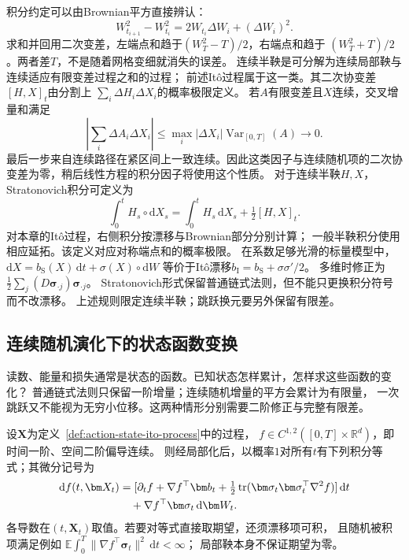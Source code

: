 积分约定可以由Brownian平方直接辨认：
\[
 W_{t_{i+1}}^2-W_{t_i}^2
     =2W_{t_i}\Delta W_i+(\Delta W_i)^2.
\]
求和并回用二次变差，左端点和趋于$(W_T^2-T)/2$，右端点和趋于
$(W_T^2+T)/2$。两者差$T$，不是随着网格变细就消失的误差。
连续半鞅是可分解为连续局部鞅与连续适应有限变差过程之和的过程；
前述Itô过程属于这一类。其二次协变差$[H,X]_t$由分割上
$\sum_i\Delta H_i\Delta X_i$的概率极限定义。
若$A$有限变差且$X$连续，交叉增量和满足
\[
 \left|\sum_i\Delta A_i\Delta X_i\right|
 \leq\max_i|\Delta X_i|\operatorname{Var}_{[0,T]}(A)
 \longrightarrow0.
\]
最后一步来自连续路径在紧区间上一致连续。因此这类因子与连续随机项的二次协变差为零，稍后线性方程的积分因子将使用这个性质。
对于连续半鞅$H,X$，
Stratonovich积分可定义为
\[
  \int_0^t H_s\circ\mathrm dX_s
       =\int_0^t H_s\,\mathrm dX_s+\tfrac12[H,X]_t.
\]
对本章的Itô过程，右侧积分按漂移与Brownian部分分别计算；
一般半鞅积分使用相应延拓。该定义对应对称端点和的概率极限。
在系数足够光滑的标量模型中，
$\mathrm dX=b_{\mathrm S}(X)\,\mathrm dt+\sigma(X)\circ\mathrm dW$
等价于Itô漂移$b_{\mathrm I}=b_{\mathrm S}+\sigma\sigma'/2$。
多维时修正为$\frac12\sum_j(D\bm\sigma_{\cdot j})\bm\sigma_{\cdot j}$。
Stratonovich形式保留普通链式法则，但不能只更换积分符号而不改漂移。
上述规则限定连续半鞅；跳跃换元要另外保留有限差。

\subsection{连续随机演化下的状态函数变换}
读数、能量和损失通常是状态的函数。已知状态怎样累计，怎样求这些函数的变化？
普通链式法则只保留一阶增量；连续随机增量的平方会累计为有限量，
一次跳跃又不能视为无穷小位移。这两种情形分别需要二阶修正与完整有限差。


\begin{theorem}[Itô公式]
  \label{thm:dynamical-ito-formula}
  设$\bm X$为定义~\ref{def:action-state-ito-process}中的过程，
  $f\in C^{1,2}([0,T]\times\mathbb R^d)$，即时间一阶、空间二阶偏导连续。
  则经局部化后，以概率$1$对所有$t$有下列积分等式；其微分记号为
  \begin{align}
    \mathrm df(t,\bm X_t)
      &=[\partial_t f+\nabla f^\top\bm b_t
         +\tfrac12\operatorname{tr}
               (\bm\sigma_t\bm\sigma_t^\top\nabla^2 f)]\,\mathrm dt\notag\\
      &\quad+\nabla f^\top\bm\sigma_t\,\mathrm d\bm W_t.
    \label{eq:dynamical-ito-formula}
  \end{align}
  各导数在$(t,\bm X_t)$取值。若要对等式直接取期望，还须漂移项可积，
  且随机被积项满足例如
  $\mathbb E\int_0^T\|\nabla f^\top\bm\sigma_t\|^2\,\mathrm dt<\infty$；
  局部鞅本身不保证期望为零。
\end{theorem}

